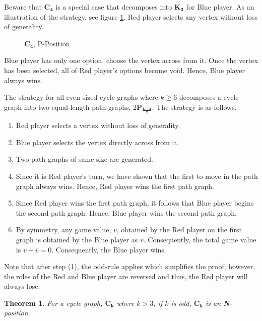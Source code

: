 \documentclass{sig-alternate}
\newtheorem{theorem}{Theorem}
\newcommand\npos[0]{\textbf{N}}
\begin{document}
	Beware that $\mathbf{C_4}$ is a special case that decomposes into
	$\mathbf{K_3}$ for Blue player. As an illustration of the strategy, see figure
	\ref{fig:c4}. Red player selects any vertex without loss of generality.
	\begin{figure}[h]
		\label{fig:c4}
		\centering
		\begin{tikzpicture}[node distance=3cm]
		
		\end{tikzpicture}
		\caption{$\mathbf{C_4}$, P-Position}
	\end{figure}
	Blue player has only one option: choose the vertex across from it. Once the
	vertex has been selected, all of Red player's options become void. Hence,
	Blue player always wins.

	The strategy for all even-sized cycle graphs where $k \geq 6$ decomposes a
	cycle-graph into two equal-length path-graphs,
	$2\mathbf{P_{\frac{k-2}{2}}}$. The strategy is as follows.
	\begin{enumerate}
		\item Red player selects a vertex without loss of generality.
		\item Blue player selects the vertex directly across from it.
		\item Two path graphs of same size are generated.
		\item Since it is Red player's turn, we have shown that the first to move
			in the path graph always wins.  Hence, Red player wins the first
			path graph.
		\item Since Red player wins the first path graph, it follows that Blue player
			begins the second path graph. Hence, Blue player wins the second path
			graph.
		\item By symmetry, any game value, $v$, obtained by the Red player on
			the first graph is obtained by the Blue player as $\overline{v}$.
			Consequently, the total game value is $v + \overline{v} = 0$.
			Consequently, the Blue player wins.
	\end{enumerate}
	Note that after step (1), the odd-rule applies which simplifies the proof;
	however, the roles of the Red and Blue player are reversed and thus, the
	Red player will always lose.

	\begin{theorem}
	For a cycle graph, $\mathbf{C_k}$ where $k>3$, if $k$ is odd,
	$\mathbf{C_k}$ is an \npos-position.
	\end{theorem}
\end{document}
